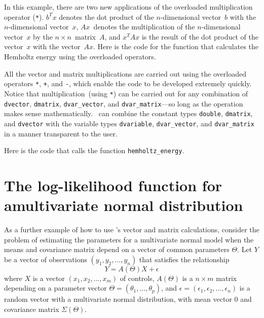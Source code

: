 \documentclass{admbmanual}
\begin{document}
In this example, there are two new applications of the overloaded multiplication operator (\texttt{*}).
$b^Tx$ denotes the dot product of the  $n$-dimensional
vector~$b$ with the $n$-dimensional vector~$x$, 
$Ax$~denotes the  multiplication of the $n$-dimensional vector~$x$ by the
$n\times n$~matrix~$A$, and $x^T Ax$ is the result of the dot
product of the vector~$x$ with the vector~$Ax$. 
Here is the code for the function that calculates the 
Hemholtz energy using the overloaded operators.



All the vector and matrix multiplications are carried out using the
overloaded operators \texttt{*},  \texttt{+}, and \texttt{-}, which enable the code to be developed 
extremely 
quickly.  Notice that multiplication~(using \texttt{*}) can be carried out for
any combination of \texttt{dvector}, \texttt{dmatrix}, \texttt{dvar\_vector}, and \texttt{dvar\_matrix}---so
long as the operation makes sense mathematically. \scAD\ can combine the
constant types \texttt{double}, \texttt{dmatrix}, and \texttt{dvector} with the variable types
\texttt{dvariable},
\texttt{dvar\_vector}, and \texttt{dvar\_matrix} in a manner transparent to the
user.  

Here is the code that calls the function \texttt{hemholtz\_energy}. 



\section{The log-likelihood function for a\br multivariate normal distribution}

As a further example of how to use \scAD's vector and matrix
calculations, consider the problem of estimating
the parameters for a multivariate normal model
when the means and covariance matrix depend on a vector
of common parameters $\Theta$.
Let $Y$ be a vector of observations $(y_1, y_2,\ldots,y_n)$
that satisfies the relationship
\begin{equation*}
  Y = A(\Theta)X + \epsilon
\end{equation*}
where 
$X$ is a vector $(x_1, x_2,\ldots,x_m)$ of controls,
$A(\Theta)$ is a $n\times m$ matrix depending on a 
parameter vector $\Theta=(\theta_1,\ldots,\theta_p)$, 
and $\epsilon=(\epsilon_1, \epsilon_2,\ldots,\epsilon_n)$ 
is a random vector with a multivariate
normal distribution, with mean vector $0$ and
covariance matrix $\Sigma(\Theta)$.
\end{document}
